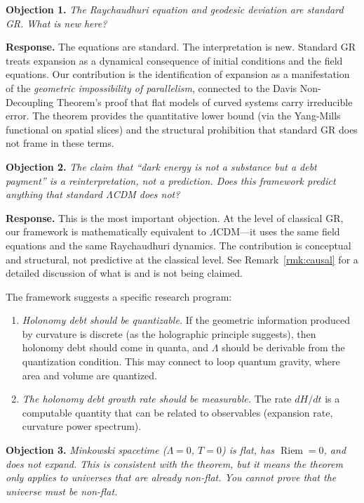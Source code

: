 \documentclass[12pt]{amsart}
\theoremstyle{definition}
\newcommand{\Riem}{\operatorname{Riem}}
\begin{document}
\textbf{Objection 1.}  \emph{The Raychaudhuri equation and geodesic deviation are standard GR.  What is new here?}

\textbf{Response.}  The equations are standard.  The interpretation is new.  Standard GR treats expansion as a dynamical consequence of initial conditions and the field equations.  Our contribution is the identification of expansion as a manifestation of the \emph{geometric impossibility of parallelism}, connected to the Davis Non-Decoupling Theorem's proof that flat models of curved systems carry irreducible error.  The theorem provides the quantitative lower bound (via the Yang-Mills functional on spatial slices) and the structural prohibition that standard GR does not frame in these terms.

\textbf{Objection 2.}  \emph{The claim that ``dark energy is not a substance but a debt payment'' is a reinterpretation, not a prediction.  Does this framework predict anything that standard $\Lambda$CDM does not?}

\textbf{Response.}  This is the most important objection.  At the level of classical GR, our framework is mathematically equivalent to $\Lambda$CDM---it uses the same field equations and the same Raychaudhuri dynamics.  The contribution is conceptual and structural, not predictive at the classical level.  See Remark~\ref{rmk:causal} for a detailed discussion of what is and is not being claimed.

The framework suggests a specific research program:
\begin{enumerate}[label=(\alph*)]
\item \emph{Holonomy debt should be quantizable.}  If the geometric information produced by curvature is discrete (as the holographic principle suggests), then holonomy debt should come in quanta, and $\Lambda$ should be derivable from the quantization condition.  This may connect to loop quantum gravity, where area and volume are quantized.
\item \emph{The holonomy debt growth rate should be measurable.}  The rate $dH/dt$ is a computable quantity that can be related to observables (expansion rate, curvature power spectrum).
\end{enumerate}

\textbf{Objection 3.}  \emph{Minkowski spacetime ($\Lambda = 0$, $T = 0$) is flat, has $\Riem = 0$, and does not expand.  This is consistent with the theorem, but it means the theorem only applies to universes that are already non-flat.  You cannot prove that the universe \emph{must} be non-flat.}
\end{document}
